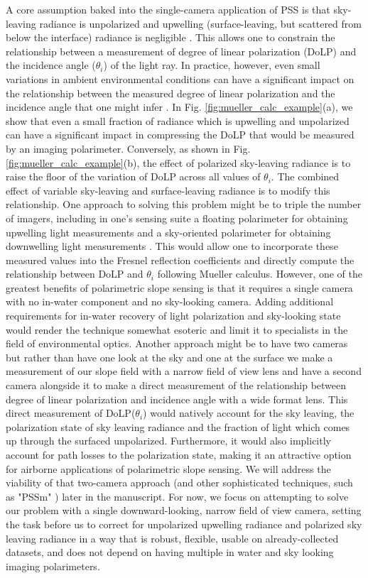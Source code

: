 \documentclass[letterpaper,draftcls,onecolumn]{IEEEtran}
\begin{document}
A core assumption baked into the single-camera application of PSS is that sky-leaving radiance is unpolarized and upwelling (surface-leaving, but scattered from below the interface) radiance is negligible \cite{Zappa2008}. This allows one to constrain the relationship between a measurement of degree of linear polarization (DoLP) and the incidence angle ($\theta_i$) of the light ray. In practice, however, even small variations in ambient environmental conditions can have a significant impact on the relationship between the measured degree of linear polarization and the incidence angle that one might infer \cite{goldstein_polarized_2017,voss-liu-1997}. In Fig. \ref{fig:mueller_calc_example}(a), we show that even a small fraction of radiance which is upwelling and unpolarized can have a significant impact in compressing the DoLP that would be measured by an imaging polarimeter. Conversely, as shown in Fig. \ref{fig:mueller_calc_example}(b), the effect of polarized sky-leaving radiance is to raise the floor of the variation of DoLP across all values of $\theta_i$. The combined effect of variable sky-leaving and surface-leaving radiance is to modify this relationship. One approach to solving this problem might be to triple the number of imagers, including in one's sensing suite a floating polarimeter for obtaining upwelling light measurements and a sky-oriented polarimeter for obtaining downwelling light measurements \cite{Barsic2012}. This would allow one to incorporate these measured values into the Fresnel reflection coefficients and directly compute the relationship between DoLP and $\theta_i$ following Mueller calculus. However, one of the greatest benefits of polarimetric slope sensing is that it requires a single camera with no in-water component and no sky-looking camera. Adding additional requirements for in-water recovery of light polarization and sky-looking state would render the technique somewhat esoteric and limit it to specialists in the field of environmental optics. Another approach might be to have two cameras but rather than have one look at the sky and one at the surface we make a measurement of our slope field with a narrow field of view lens and have a second camera alongside it to make a direct measurement of the relationship between degree of linear polarization and incidence angle with a wide format lens. This direct measurement of DoLP($\theta_i$) would natively account for the sky leaving, the polarization state of sky leaving radiance and the fraction of light which comes up through the surfaced unpolarized. Furthermore, it would also implicitly account for path losses to the polarization state, making it an attractive option for airborne applications of polarimetric slope sensing. We will address the viability of that two-camera approach (and other sophisticated techniques, such as "PSSm" \cite{malinowski_surface_2024}) later in the manuscript. For now, we focus on attempting to solve our problem with a single downward-looking, narrow field of view camera, setting the task before us to correct for unpolarized upwelling radiance and polarized sky leaving radiance in a way that is robust, flexible, usable on already-collected datasets, and does not depend on having multiple in water and sky looking imaging polarimeters.
\end{document}
